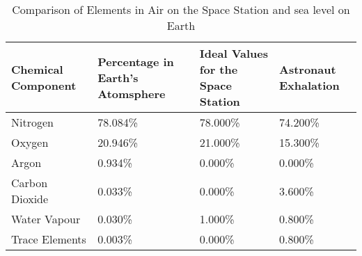 \begin{table}[htdp]
\caption{Comparison of Elements in Air on the Space Station and sea level on Earth}\label{default}
\begin{tabularx}{\linewidth}{|>{\RaggedRight}p{2.5cm}|x|x|x|}\hline
Chemical Component & Percentage in Earth's Atomsphere & Ideal Values for the Space Station & Astronaut Exhalation\\ \hline
Nitrogen      & 78.084\% & 78.000\% & 74.200\% \\ \hline
Oxygen        & 20.946\% & 21.000\% & 15.300\% \\ \hline
Argon         & 0.934\%  &  0.000\% &  0.000\% \\ \hline
Carbon Dioxide& 0.033\%  &  0.000\% &  3.600\% \\ \hline
Water Vapour  & 0.030\%  &  1.000\% &  0.800\% \\ \hline
Trace Elements& 0.003\%  &  0.000\% &  0.800\% \\ \hline
\end{tabularx}
\end{table}

